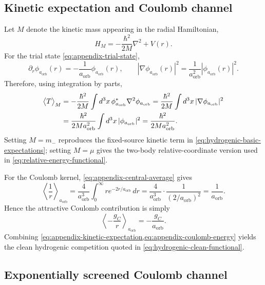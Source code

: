 \documentclass[11pt]{article}
\theoremstyle{plain}
\theoremstyle{definition}
\theoremstyle{remark}
\newcommand{\aorb}{a_{\mathrm{orb}}}
\begin{document}
\subsection{Kinetic expectation and Coulomb channel}\label{subsec:hydrogenic-integral-kinetic}

Let $M$ denote the kinetic mass appearing in the radial Hamiltonian,
\begin{equation}
H_M = -\frac{\hbar^2}{2M}\nabla^2 + V(r).
\label{eq:appendix-kinetic-hamiltonian}
\end{equation}
For the trial state \cref{eq:appendix-trial-state},
\begin{equation}
\partial_r \phi_{\aorb}(r) = -\frac{1}{\aorb}\phi_{\aorb}(r),
\qquad
|\nabla \phi_{\aorb}(r)|^2 = \frac{1}{\aorb^2}|\phi_{\aorb}(r)|^2.
\label{eq:appendix-gradient-trial}
\end{equation}
Therefore, using integration by parts,
\begin{align}
\bigl\langle T\bigr\rangle_M
&=
-\frac{\hbar^2}{2M}\int d^3x\,\phi_{\aorb}^*\nabla^2 \phi_{\aorb}
=
\frac{\hbar^2}{2M}\int d^3x\,|\nabla\phi_{\aorb}|^2
\notag\\
&=
\frac{\hbar^2}{2M\aorb^2}\int d^3x\,|\phi_{\aorb}|^2
=
\frac{\hbar^2}{2M\aorb^2}.
\label{eq:appendix-kinetic-expectation}
\end{align}
Setting $M=m_-$ reproduces the fixed-source kinetic term in \cref{eq:hydrogenic-basic-expectations}; setting $M=\mu$ gives the two-body relative-coordinate version used in \cref{eq:relative-energy-functional}.

For the Coulomb kernel, \cref{eq:appendix-central-average} gives
\begin{equation}
\left\langle \frac{1}{r} \right\rangle_{\aorb}
=
\frac{4}{\aorb^3}\int_0^\infty r e^{-2r/\aorb}\,dr
=
\frac{4}{\aorb^3}\cdot\frac{1}{(2/\aorb)^2}
=
\frac{1}{\aorb}.
\label{eq:appendix-coulomb-expectation}
\end{equation}
Hence the attractive Coulomb contribution is simply
\begin{equation}
\left\langle -\frac{g_C}{r} \right\rangle_{\aorb} = -\frac{g_C}{\aorb}.
\label{eq:appendix-coulomb-energy}
\end{equation}
Combining \cref{eq:appendix-kinetic-expectation,eq:appendix-coulomb-energy} yields the clean hydrogenic competition quoted in \cref{eq:hydrogenic-clean-functional}.

\subsection{Exponentially screened Coulomb channel}\label{subsec:hydrogenic-integral-yukawa}
\end{document}
